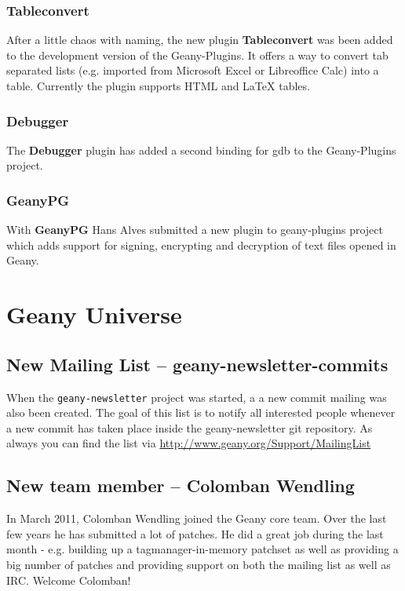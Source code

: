\documentclass[%
paper=a4,%
fontsize=12pt,%
twoside=false,%
DIV18,
headsepline,
plainheadsepline,
footsepline,
plainfootsepline,
parskip=half,%
openany,%
]{scrartcl}
\begin{document}
\subsubsection{Tableconvert}

After a little chaos with naming, the new plugin \textbf{Tableconvert}
was been added to the development version of the Geany-Plugins. It
offers a way to convert tab separated lists (e.g. imported
from Microsoft Excel or Libreoffice Calc) into a table. Currently the
plugin supports HTML and \LaTeX{} tables.

\subsubsection{Debugger}

The \textbf{Debugger} plugin has added a second binding for gdb to
the Geany-Plugins project.

\subsubsection{GeanyPG}

With \textbf{GeanyPG} Hans Alves submitted a new plugin to
geany-plugins project which adds support for signing,
encrypting and decryption of text files opened in Geany.

\section{Geany Universe}

\subsection{New Mailing List -- geany-newsletter-commits}

When the \texttt{geany-newsletter} project was started, a
a new commit mailing was also been created. The goal of this list is
to notify all interested people whenever a new commit has taken place
inside the geany-newsletter git repository. As always you can find
the list via \url{http://www.geany.org/Support/MailingList}

\subsection{New team member -- Colomban Wendling}

In March 2011, Colomban Wendling joined the Geany core team. Over
the last few years he has submitted a lot of patches. He did a great
job during the last month - e.g. building up a tagmanager-in-memory
patchset as well as providing a big number of patches and providing
support on both the mailing list as well as IRC. Welcome Colomban!
\end{document}
